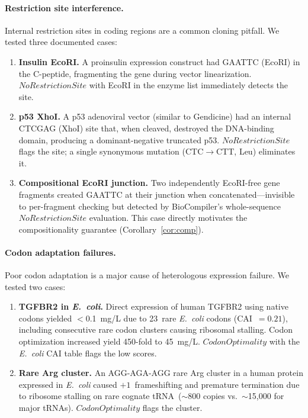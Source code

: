 \documentclass[acmsmall,review,anonymous]{acmart}
\begin{document}
\paragraph{Restriction site interference.}
Internal restriction sites in coding regions are a common cloning
pitfall.  We tested three documented cases:

\begin{enumerate}[leftmargin=*,itemsep=1pt,topsep=2pt]
\item \textbf{Insulin EcoRI.}  A proinsulin expression construct had
GAATTC (EcoRI) in the C-peptide, fragmenting the gene during vector
linearization.  $\mathit{NoRestrictionSite}$ with EcoRI in the enzyme
list immediately detects the site.

\item \textbf{p53 XhoI.}  A p53 adenoviral vector (similar to
Gendicine) had an internal CTCGAG (XhoI) site that, when cleaved,
destroyed the DNA-binding domain, producing a dominant-negative
truncated p53.  $\mathit{NoRestrictionSite}$ flags the site; a single
synonymous mutation (CTC$\to$CTT, Leu) eliminates it.

\item \textbf{Compositional EcoRI junction.}  Two independently
EcoRI-free gene fragments created GAATTC at their junction when
concatenated---invisible to per-fragment checking but detected by
BioCompiler's whole-sequence $\mathit{NoRestrictionSite}$ evaluation.
This case directly motivates the compositionality guarantee
(Corollary~\ref{cor:comp}).
\end{enumerate}

\paragraph{Codon adaptation failures.}
Poor codon adaptation is a major cause of heterologous expression
failure.  We tested two cases:

\begin{enumerate}[leftmargin=*,itemsep=1pt,topsep=2pt]
\item \textbf{TGFBR2 in \textit{E.~coli}.}  Direct expression of human
TGFBR2 using native codons yielded $<$0.1~mg/L due to 23~rare
\textit{E.~coli} codons (CAI~$= 0.21$), including consecutive rare
codon clusters causing ribosomal stalling.  Codon optimization increased
yield 450-fold to 45~mg/L.
$\mathit{CodonOptimality}$ with the \textit{E.~coli} CAI table flags
the low scores.

\item \textbf{Rare Arg cluster.}  An AGG-AGA-AGG rare Arg cluster in
a human protein expressed in \textit{E.~coli} caused $+1$~frameshifting
and premature termination due to ribosome stalling on rare cognate
tRNA~($\sim$800 copies vs.~$\sim$15{,}000 for major tRNAs).
$\mathit{CodonOptimality}$ flags the cluster.
\end{enumerate}
\end{document}
